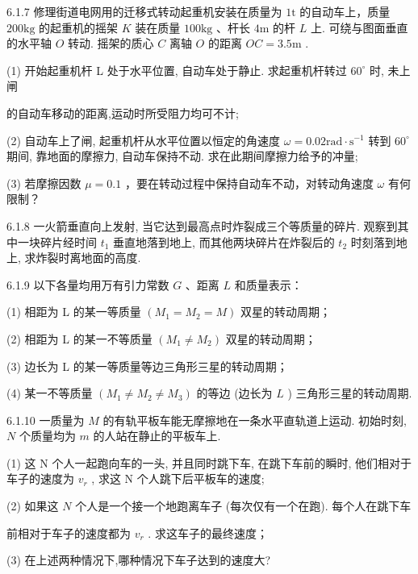 \begin{problem}{6.1.7}
修理街道电网用的迁移式转动起重机安装在质量为 $1\mathrm{t}$ 的自动车上，质量 $200\mathrm{kg}$ 的起重机的摇架 $K$ 装在质量 $100\mathrm{kg}$ 、杆长 $4\mathrm{m}$ 的杆 $L$ 上. 可绕与图面垂直的水平轴 $O$ 转动. 摇架的质心 $C$ 离轴 $O$ 的距离 $OC = 3.5\mathrm{m}$ .

(1) 开始起重机杆 L 处于水平位置, 自动车处于静止. 求起重机杆转过 $60^{\circ}$ 时, 未上闸

的自动车移动的距离,运动时所受阻力均可不计;

(2) 自动车上了闸, 起重机杆从水平位置以恒定的角速度 $\omega = 0.02\mathrm{rad}\cdot \mathrm{s}^{-1}$ 转到 $60^{\circ}$ 期间, 靠地面的摩擦力, 自动车保持不动. 求在此期间摩擦力给予的冲量;

(3) 若摩擦因数 $\mu=0.1$ ，要在转动过程中保持自动车不动，对转动角速度 $\omega$ 有何限制？
\begin{center}

\end{center}
\end{problem}
\clearpage


\begin{problem}{6.1.8}
一火箭垂直向上发射, 当它达到最高点时炸裂成三个等质量的碎片. 观察到其中一块碎片经时间 $t_1$ 垂直地落到地上, 而其他两块碎片在炸裂后的 $t_2$ 时刻落到地上, 求炸裂时离地面的高度.
\end{problem}
\clearpage


\begin{problem}{6.1.9}
以下各量均用万有引力常数 $G$ 、距离 $L$ 和质量表示：

(1) 相距为 L 的某一等质量 $(M_{1}=M_{2}=M)$ 双星的转动周期；

(2) 相距为 L 的某一不等质量 $(M_{1} \neq M_{2})$ 双星的转动周期；

(3) 边长为 L 的某一等质量等边三角形三星的转动周期；

(4) 某一不等质量 $(M_{1} \neq M_{2} \neq M_{3})$ 的等边 (边长为 $L$ ) 三角形三星的转动周期.
\end{problem}
\clearpage


\begin{problem}{6.1.10}
一质量为 $M$ 的有轨平板车能无摩擦地在一条水平直轨道上运动. 初始时刻, $N$ 个质量均为 $m$ 的人站在静止的平板车上.

(1) 这 N 个人一起跑向车的一头, 并且同时跳下车, 在跳下车前的瞬时, 他们相对于车子的速度为 $v_{r}$ , 求这 N 个人跳下后平板车的速度;

(2) 如果这 $N$ 个人是一个接一个地跑离车子 (每次仅有一个在跑). 每个人在跳下车

前相对于车子的速度都为 $v_{r}$ . 求这车子的最终速度；

(3) 在上述两种情况下,哪种情况下车子达到的速度大?
\end{problem}
\clearpage


